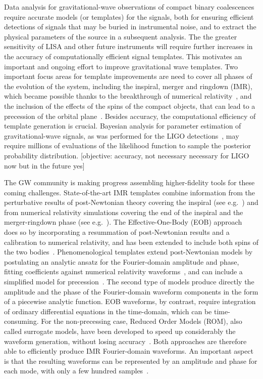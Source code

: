\documentclass[aps,showpacs,twocolumn,
prd,superscriptaddress,nofootinbib]{revtex4-1}
\newcommand{\SM}[1]{{\color{Red} #1}}
\begin{document}
Data analysis for gravitational-wave observations of compact binary coalescences require accurate models (or templates) for the signals, both for ensuring efficient detections of signals that may be buried in instrumental noise, and to extract the physical parameters of the source in a subsequent analysis. The the greater sensitivity of LISA and other future instruments will require further increases in the accuracy of computationally efficient signal templates. This motivates an important and ongoing effort to improve gravitational wave templates. Two important focus areas for template improvements are need to cover all phases of the evolution of the system, including the inspiral, merger and ringdown (IMR), which became possible thanks to the breakthrough of numerical relativity~\cite{Pretorius05,Baker+06,Campanelli+06}, and the inclusion of the effects of the spins of the compact objects, that can lead to a precession of the orbital plane~\cite{ACST94,K95}. Besides accuracy, the computational efficiency of template generation is crucial. Bayesian analysis for parameter estimation of gravitational-wave signals, as was performed for the LIGO detections~\cite{LIGO-theeventPE-2016,LIGO-O1BBH-2016}, may require millions of evaluations of the likelihood function to sample the posterior probability distribution. \SM{[objective: accuracy, not necessary necessary for LIGO now but in the future yes]}

The GW community is making progress assembling higher-fidelity tools for these coming challenges.
State-of-the-art IMR templates combine information from the perturbative results of post-Newtonian theory covering the inspiral (see e.g.~\cite{BlanchetLiving}) and from numerical relativity simulations covering the end of the inspiral and the merger-ringdown phase (see e.g.~\cite{Pfeiffer12}). The Effective-One-Body (EOB) approach~\cite{BD99} does so by incorporating a resummation of post-Newtonian results and a calibration to numerical relativity, and has been extended to include both spins of the two bodies~\cite{Taracchini+13, Pan+13, Bohe+16}. Phenomenological templates extend post-Newtonian models by postulating an analytic ansatz for the Fourier-domain amplitude and phase, fitting coefficients against numerical relativity waveforms~\cite{Husa+15, Khan+15}, and can include a simplified model for precession~\cite{Hannam+13}. The second type of models produce directly the amplitude and the phase of the Fourier-domain waveform components in the form of a piecewise analytic function. EOB waveforms, by contrast, require integration of ordinary differential equations in the time-domain, which can be time-consuming. For the non-precessing case, Reduced Order Models (ROM), also called surrogate models, have been developed to speed up considerably the waveform generation, without losing accuracy~\cite{Field+13, Puerrer14, Bohe+16}. Both approaches are therefore able to efficiently produce IMR Fourier-domain waveforms. An important aspect is that the resulting waveforms can be represented by an amplitude and phase for each mode, with only a few hundred samples~\cite{Puerrer14}.
\end{document}
